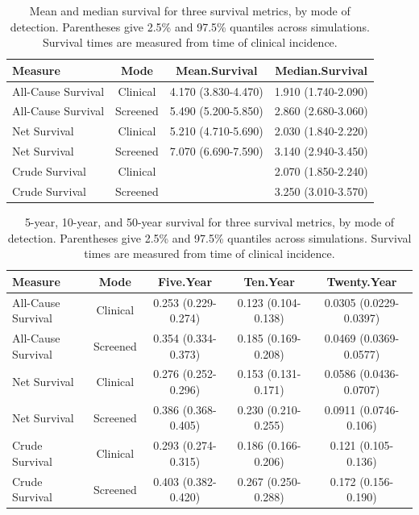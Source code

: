 \documentclass[11pt]{article}
\begin{document}
\begin{table}[!ht]
\centering
\begin{tabular}{lccc}
  \hline
Measure & Mode & Mean.Survival & Median.Survival \\ 
  \hline
All-Cause Survival & Clinical & 4.170 (3.830-4.470) & 1.910 (1.740-2.090) \\ 
  All-Cause Survival & Screened & 5.490 (5.200-5.850) & 2.860 (2.680-3.060) \\ 
  Net Survival & Clinical & 5.210 (4.710-5.690) & 2.030 (1.840-2.220) \\ 
  Net Survival & Screened & 7.070 (6.690-7.590) & 3.140 (2.940-3.450) \\ 
  Crude Survival & Clinical &  & 2.070 (1.850-2.240) \\ 
  Crude Survival & Screened &  & 3.250 (3.010-3.570) \\ 
   \hline
\end{tabular}
\caption{Mean and  median survival for three survival metrics, by mode of detection. Parentheses give 2.5\% and 97.5\% quantiles across simulations. Survival times are measured from time of clinical incidence.} 
\label{tab:mmsurv}
\end{table}
\begin{table}[!ht]
\centering
\begin{tabular}{lcccc}
  \hline
Measure & Mode & Five.Year & Ten.Year & Twenty.Year \\ 
  \hline
All-Cause Survival & Clinical & 0.253 (0.229-0.274) & 0.123 (0.104-0.138) & 0.0305 (0.0229-0.0397) \\ 
  All-Cause Survival & Screened & 0.354 (0.334-0.373) & 0.185 (0.169-0.208) & 0.0469 (0.0369-0.0577) \\ 
  Net Survival & Clinical & 0.276 (0.252-0.296) & 0.153 (0.131-0.171) & 0.0586 (0.0436-0.0707) \\ 
  Net Survival & Screened & 0.386 (0.368-0.405) & 0.230 (0.210-0.255) & 0.0911 (0.0746-0.106) \\ 
  Crude Survival & Clinical & 0.293 (0.274-0.315) & 0.186 (0.166-0.206) & 0.121 (0.105-0.136) \\ 
  Crude Survival & Screened & 0.403 (0.382-0.420) & 0.267 (0.250-0.288) & 0.172 (0.156-0.190) \\ 
   \hline
\end{tabular}
\caption{5-year, 10-year, and 50-year survival for three survival metrics, by mode of detection. Parentheses give 2.5\% and 97.5\% quantiles across simulations. Survival times are measured from time of clinical incidence.} 
\label{tab:ksurv}
\end{table}
\end{document}
